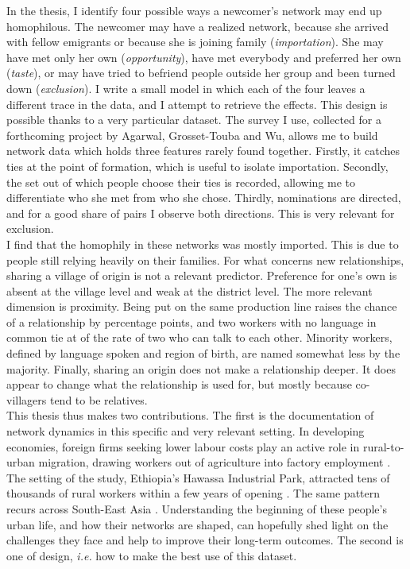 \noindent In the thesis, I identify four possible ways a newcomer's network may end up homophilous. The newcomer may have a realized network, because she arrived with fellow emigrants or because she is joining family (\textit{importation}). She may have met only her own (\textit{opportunity}), have met everybody and preferred her own (\textit{taste}), or may have tried to befriend people outside her group and been turned down (\textit{exclusion}). I write a small model in which each of the four leaves a different trace in the data, and I attempt to retrieve the effects. This design is possible thanks to a very particular dataset. The survey I use, collected for a forthcoming project by Agarwal, Grosset-Touba and Wu, allows me to build network data which holds three features rarely found together. Firstly, it catches ties at the point of formation, which is useful to isolate importation. Secondly, the set out of which people choose their ties is recorded, allowing me to differentiate who she met from who she chose. Thirdly, nominations are directed, and for a good share of pairs I observe both directions. This is very relevant for exclusion. \\

\noindent I find that the homophily in these networks was mostly imported. This is due to people still relying heavily on their families. For what concerns new relationships, sharing a village of origin is not a relevant predictor. Preference for one's own is absent at the village level and weak at the district level. The more relevant dimension is proximity. Being put on the same production line raises the chance of a relationship by \pnChanOppUnitPp{} percentage points, and two workers with no language in common tie at \pnChanOppKappa{} of the rate of two who can talk to each other. Minority workers, defined by language spoken and region of birth, are named somewhat less by the majority. Finally, sharing an origin does not make a relationship deeper. It does appear to change what the relationship is used for, but mostly because co-villagers tend to be relatives. \\


\noindent This thesis thus makes two contributions. The first is the documentation of network dynamics in this specific and very relevant setting.  In developing economies, foreign firms seeking lower labour costs play an active role in rural-to-urban migration, drawing workers out of agriculture into factory employment \citep{barrett2019made}. The setting of the study, Ethiopia's Hawassa Industrial Park, attracted tens of thousands of rural workers within a few years of opening \citep{mains2021ethiopian}. The same pattern recurs across South-East Asia \citep{heath2018why}. Understanding the beginning of these people's urban life, and how their networks are shaped, can hopefully shed light on the challenges they face and help to improve their long-term outcomes. The second is one of design, \textit{i.e.} how to make the best use of this dataset. \\

